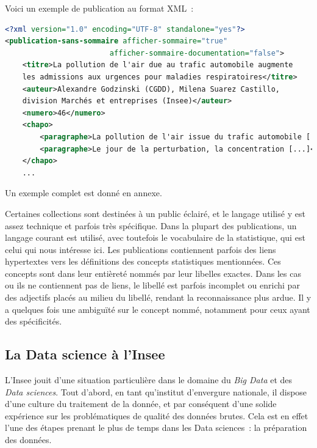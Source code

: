 Voici un exemple de publication au format XML~: 
\begin{lstlisting}[language=XML, basicstyle=\small]
<?xml version="1.0" encoding="UTF-8" standalone="yes"?>
<publication-sans-sommaire afficher-sommaire="true"
                        afficher-sommaire-documentation="false">
	<titre>La pollution de l'air due au trafic automobile augmente 
	les admissions aux urgences pour maladies respiratoires</titre>
	<auteur>Alexandre Godzinski (CGDD), Milena Suarez Castillo, 
	division Marchés et entreprises (Insee)</auteur>
	<numero>46</numero>
	<chapo>
		<paragraphe>La pollution de l'air issue du trafic automobile [...]<paragraphe>
		<paragraphe>Le jour de la perturbation, la concentration [...]</paragraphe>
	</chapo>
	...
\end{lstlisting}

Un exemple complet est donné en annexe.
\newline

Certaines collections sont destinées à un public éclairé, et le langage utilisé y est assez technique et parfois très spécifique. Dans la plupart des publications, un langage courant est utilisé, avec toutefois le vocabulaire de la statistique, qui est celui qui nous intéresse ici. Les publications contiennent parfois des liens hypertextes vers les définitions des concepts statistiques mentionnées. Ces concepts sont dans leur entièreté nommés par leur libelles exactes. Dans les cas ou ils ne contiennent pas de liens, le libellé est parfois incomplet ou enrichi par des adjectifs placés au milieu du libellé, rendant la reconnaissance plus ardue. Il y a quelques fois une ambiguïté sur le concept nommé, notamment pour ceux ayant des spécificités.
\label{section 1.2.2}

\subsection{La Data science à l'Insee}

L'Insee jouit d'une situation particulière dans le domaine du \textit{Big Data} et des \textit{Data sciences}. Tout d'abord, en tant qu'institut d'envergure nationale, il dispose d'une culture du traitement de la donnée, et par conséquent d'une solide expérience sur les problématiques de qualité des données brutes. Cela est en effet l'une des étapes prenant le plus de temps dans les Data sciences~: la préparation des données.
\newline

